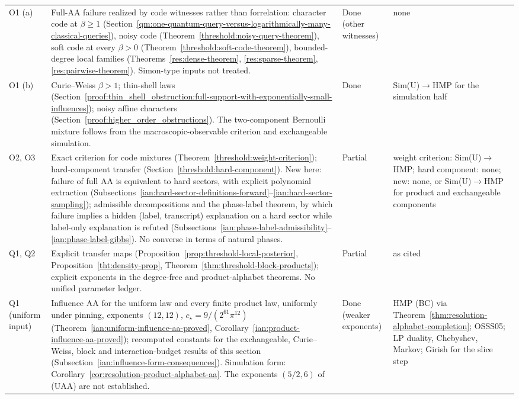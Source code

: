 \begin{longtable}{@{}p{}p{}p{}p{}@{}}
O1 (a) & Full-AA failure realized by code witnesses rather than forrelation: character code at \(\beta\ge1\) (Section~\ref{qm:one-quantum-query-versus-logarithmically-many-classical-queries}), noisy code (Theorem~\ref{threshold:noisy-query-theorem}), soft code at every \(\beta>0\) (Theorem~\ref{threshold:soft-code-theorem}), bounded-degree local families (Theorems~\ref{res:dense-theorem}, \ref{res:sparse-theorem}, \ref{res:pairwise-theorem}). Simon-type inputs not treated. & Done (other witnesses) & none\\
O1 (b) & Curie--Weiss \(\beta>1\); thin-shell laws (Section~\ref{proof:thin_shell_obstruction:full-support-with-exponentially-small-influences}); noisy affine characters (Section~\ref{proof:higher_order_obstructions}). The two-component Bernoulli mixture follows from the macroscopic-observable criterion and exchangeable simulation. & Done & Sim(U)\(\to\)HMP for the simulation half\\
O2, O3 & Exact criterion for code mixtures (Theorem~\ref{threshold:weight-criterion}); hard-component transfer (Section~\ref{threshold:hard-component}). New here: failure of full AA is equivalent to hard sectors, with explicit polynomial extraction (Subsections~\ref{ian:hard-sector-definitions-forward}--\ref{ian:hard-sector-sampling}); admissible decompositions and the phase-label theorem, by which failure implies a hidden (label, transcript) explanation on a hard sector while label-only explanation is refuted (Subsections~\ref{ian:phase-label-admissibility}--\ref{ian:phase-label-gibbs}). No converse in terms of natural phases. & Partial & weight criterion: Sim(U)\(\to\)HMP; hard component: none; new: none, or Sim(U)\(\to\)HMP for product and exchangeable components\\
Q1, Q2 & Explicit transfer maps (Proposition~\ref{prop:threshold-local-posterior}, Proposition~\ref{tht:density-prop}, Theorem~\ref{thm:threshold-block-products}); explicit exponents in the degree-free and product-alphabet theorems. No unified parameter ledger. & Partial & as cited\\
Q1 (uniform input) & Influence AA for the uniform law and every finite product law, uniformly under pinning, exponents \((12,12)\), \(c_\star=9/(2^{61}\pi^{12})\) (Theorem~\ref{ian:uniform-influence-aa-proved}, Corollary~\ref{ian:product-influence-aa-proved}); recomputed constants for the exchangeable, Curie--Weiss, block and interaction-budget results of this section (Subsection~\ref{ian:influence-form-consequences}). Simulation form: Corollary~\ref{cor:resolution-product-alphabet-aa}. The exponents \((5/2,6)\) of (UAA) are not established. & Done (weaker exponents) & HMP (BC) via Theorem~\ref{thm:resolution-alphabet-completion}; OSSS05; LP duality, Chebyshev, Markov; Girish for the slice step\\

\end{longtable}
